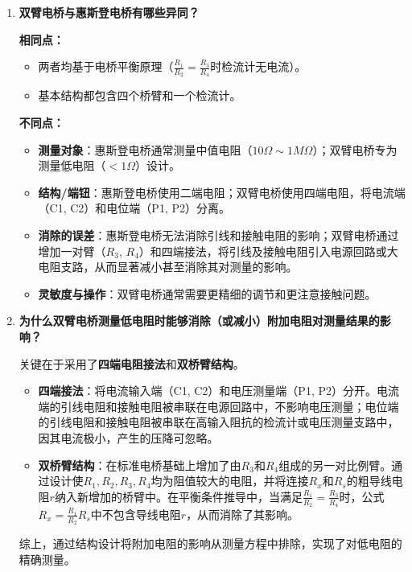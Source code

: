 \documentclass[10pt,a4paper]{ctexart}
\begin{document}
    \begin{enumerate}
        \item \textbf{双臂电桥与惠斯登电桥有哪些异同？}
        
        \textbf{相同点：}
        \begin{itemize}
            \item 两者均基于电桥平衡原理（$\frac{R_1}{R_2}=\frac{R_3}{R_4}$时检流计无电流）。
            \item 基本结构都包含四个桥臂和一个检流计。
        \end{itemize}
        
        \textbf{不同点：}
        \begin{itemize}
            \item \textbf{测量对象}：惠斯登电桥通常测量中值电阻（$10\Omega \sim 1M\Omega$）；双臂电桥专为测量低电阻（$<1\Omega$）设计。
            \item \textbf{结构/端钮}：惠斯登电桥使用二端电阻；双臂电桥使用四端电阻，将电流端（C1, C2）和电位端（P1, P2）分离。
            \item \textbf{消除的误差}：惠斯登电桥无法消除引线和接触电阻的影响；双臂电桥通过增加一对臂（$R_3$, $R_4$）和四端接法，将引线及接触电阻引入电源回路或大电阻支路，从而显著减小甚至消除其对测量的影响。
            \item \textbf{灵敏度与操作}：双臂电桥通常需要更精细的调节和更注意接触问题。
        \end{itemize}
        
        \item \textbf{为什么双臂电桥测量低电阻时能够消除（或减小）附加电阻对测量结果的影响？}
        
        关键在于采用了\textbf{四端电阻接法}和\textbf{双桥臂结构}。
        \begin{itemize}
            \item \textbf{四端接法}：将电流输入端（C1, C2）和电压测量端（P1, P2）分开。电流端的引线电阻和接触电阻被串联在电源回路中，不影响电压测量；电位端的引线电阻和接触电阻被串联在高输入阻抗的检流计或电压测量支路中，因其电流极小，产生的压降可忽略。
            \item \textbf{双桥臂结构}：在标准电桥基础上增加了由$R_3$和$R_4$组成的另一对比例臂。通过设计使$R_1, R_2, R_3, R_4$均为阻值较大的电阻，并将连接$R_x$和$R_s$的粗导线电阻$r$纳入新增加的桥臂中。在平衡条件推导中，当满足$\frac{R_1}{R_2}=\frac{R_3}{R_4}$时，公式$R_x = \frac{R_1}{R_2}R_s$中不包含导线电阻$r$，从而消除了其影响。
        \end{itemize}
        综上，通过结构设计将附加电阻的影响从测量方程中排除，实现了对低电阻的精确测量。
        

\end{enumerate}
\end{document}
